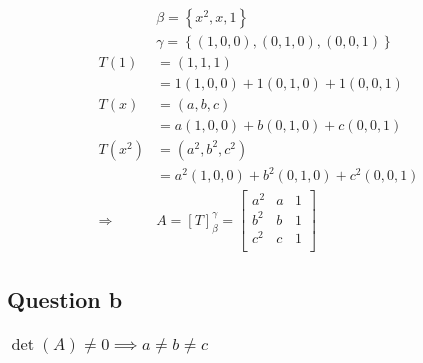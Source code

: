 \documentclass{article}
\begin{document}
~

\begin{equation*}
    \begin{split}
        &\beta =\left\{x^2,x,1\right\}\\
        &\gamma=\left\{(1,0,0),(0,1,0),(0,0,1)\right\}\\
        T(1)&=(1,1,1)\\
        &=1(1,0,0)+1(0,1,0)+1(0,0,1)\\
        T(x)&=(a,b,c)\\
        &=a(1,0,0)+b(0,1,0)+c(0,0,1)\\
        T(x^2)&=(a^2,b^2,c^2)\\
        &=a^2(1,0,0)+b^2(0,1,0)+c^2(0,0,1)\\
        \Rightarrow&A=\left[T\right]^\gamma_\beta=\begin{bmatrix}
            a^2&a&1\\
            b^2&b&1\\
            c^2&c&1\\
        \end{bmatrix}
    \end{split}
\end{equation*}

\subsection{Question b}

\subsubsection{$\det(A)\ne0\implies a\ne b\ne c$}

~
\end{document}
